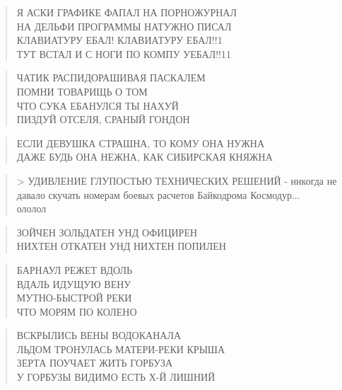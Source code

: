 \poemtitle{***}
\begin{verse}
Я АСКИ ГРАФИКЕ ФАПАЛ НА ПОРНОЖУРНАЛ\\
НА ДЕЛЬФИ ПРОГРАММЫ НАТУЖНО ПИСАЛ\\
КЛАВИАТУРУ ЕБАЛ! КЛАВИАТУРУ ЕБАЛ!!1\\
ТУТ ВСТАЛ И С НОГИ ПО КОМПУ УЕБАЛ!!11
\end{verse}

\poemtitle{***}
\begin{verse}
ЧАТИК РАСПИДОРАШИВАЯ ПАСКАЛЕМ\\
ПОМНИ ТОВАРИЩЬ О ТОМ\\
ЧТО СУКА ЕБАНУЛСЯ ТЫ НАХУЙ\\
ПИЗДУЙ ОТСЕЛЯ, СРАНЫЙ ГОНДОН
\end{verse}

\poemtitle{***}
\begin{verse}
ЕСЛИ ДЕВУШКА СТРАШНА, ТО КОМУ ОНА НУЖНА\\
ДАЖЕ БУДЬ ОНА НЕЖНА, КАК СИБИРСКАЯ КНЯЖНА
\end{verse}

\poemtitle{***}
\begin{verse}
> УДИВЛЕНИЕ ГЛУПОСТЬЮ ТЕХНИЧЕСКИХ РЕШЕНИЙ - никогда не давало скучать номерам боевых расчетов Байкодрома Космодур...\\
ололол
\end{verse}

\poemtitle{***}
\begin{verse}
ЗОЙЧЕН ЗОЛЬДАТЕН УНД ОФИЦИРЕН\\
НИХТЕН ОТКАТЕН УНД НИХТЕН ПОПИЛЕН
\end{verse}

\poemtitle{***}
\begin{verse}
БАРНАУЛ РЕЖЕТ ВДОЛЬ\\
ВДАЛЬ ИДУЩУЮ ВЕНУ\\
МУТНО-БЫСТРОЙ РЕКИ\\
ЧТО МОРЯМ ПО КОЛЕНО
\end{verse}

\poemtitle{***}
\begin{verse}
ВСКРЫЛИСЬ ВЕНЫ ВОДОКАНАЛА\\
ЛЬДОМ ТРОНУЛАСЬ МАТЕРИ-РЕКИ КРЫША\\
ЗЕРТА ПОУЧАЕТ ЖИТЬ ГОРБУЗА\\
У ГОРБУЗЫ ВИДИМО ЕСТЬ Х-Й ЛИШНИЙ
\end{verse}


